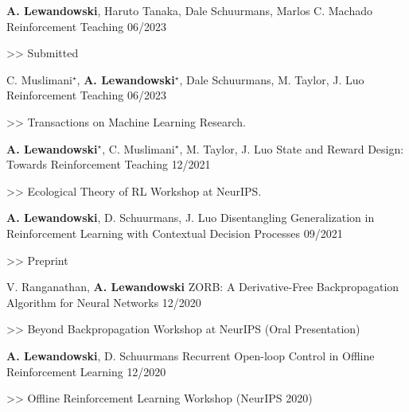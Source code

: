 \begin{cventries}
    \cventry
    {\textbf{A. Lewandowski}, Haruto Tanaka, Dale Schuurmans, Marlos C. Machado}
    {Reinforcement Teaching}
    {06/2023}
    {
      \begin{cvitems}
    	\item[>>] Submitted
      \end{cvitems}
    }

    \cventry
    {C. Muslimani$^{\star}$, \textbf{A. Lewandowski}$^\star$, Dale Schuurmans, M. Taylor, J. Luo}
    {Reinforcement Teaching}
    {06/2023}
    {
      \begin{cvitems}
    	\item[>>] Transactions on Machine Learning Research.
      \end{cvitems}
    }

    \cventry
    {\textbf{A. Lewandowski}$^\star$, C. Muslimani$^{\star}$, M. Taylor, J. Luo}
    {State and Reward Design: Towards Reinforcement Teaching}
    {12/2021}
    {
      \begin{cvitems}
        \item[>>] Ecological Theory of RL Workshop at NeurIPS.
      \end{cvitems}
    }

    \cventry
    {\textbf{A. Lewandowski}, D. Schuurmans, J. Luo}
    {Disentangling Generalization in Reinforcement Learning with Contextual
      Decision Processes}
    {09/2021}
    {
      \begin{cvitems}
    	\item[>>] Preprint
      \end{cvitems}
    }

    \cventry
    {V. Ranganathan, \textbf{A. Lewandowski}}
    {ZORB: A Derivative-Free Backpropagation Algorithm for Neural Networks}
    {12/2020}
    {
      \begin{cvitems}
    	\item[>>] Beyond Backpropagation Workshop at NeurIPS (Oral
      Presentation)
      \end{cvitems}
    }

    \cventry
    { \textbf{A. Lewandowski}, D. Schuurmans}
    {Recurrent Open-loop Control in Offline Reinforcement Learning}
    {12/2020}
    {
      \begin{cvitems}
    	\item[>>] Offline Reinforcement Learning Workshop (NeurIPS 2020)
      \end{cvitems}
    }


\end{cventries}

